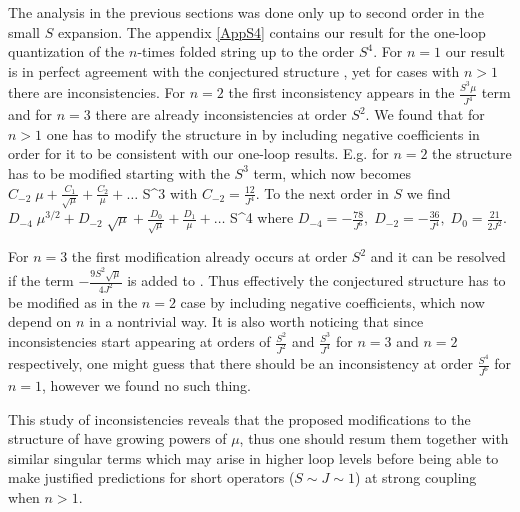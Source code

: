 
The analysis in the previous sections was done only up to second order in the small $S$ expansion. The appendix \ref{AppS4} contains our result for the
one-loop quantization of the $n$-times folded string up to the order $S^4$. For $n=1$ our result is in perfect agreement with the conjectured structure , yet for cases with $n>1$ there are inconsistencies.
For $n=2$ the first inconsistency appears in the $\frac{S^3\mu}{J^4}$ term and for $n=3$ there are already inconsistencies at order $S^2$. We found that for $n>1$ one has to modify the structure in  by
including negative coefficients in order for it to be consistent with our one-loop results. E.g. for $n=2$ the structure has to be modified starting with the $S^3$ term, which now becomes
\beq
\(
C_{-2}\;\mu+\frac{C_1}{\sqrt\mu}+\frac{C_2}{\mu}+\dots
\) S^3
\eeq
with $C_{-2}=\frac{12}{J^4}$. To the next order in $S$ we find
\beq
\(
D_{-4}\;\mu^{3/2} +D_{-2}\;\sqrt{\mu}+ \frac{D_{0}}{\sqrt\mu}+\frac{D_1}{\mu}+\dots
\) S^4
\eeq
where $D_{-4}=-\frac{78}{J^6},\;D_{-2}=-\frac{36}{J^4},\;D_0=\frac{21}{2J^2}$.

For $n=3$ the first modification already occurs at order $S^2$ and it can be resolved if the term $-\frac{9 S^2\sqrt\mu}{4 J^2}$ is added to .
Thus effectively the conjectured structure  has to be modified as in the $n=2$ case by including negative coefficients, which now depend on $n$ in a nontrivial way.
It is also worth noticing that since inconsistencies start appearing at orders of $\frac{S^2}{J^2}$ and $\frac{S^3}{J^4}$ for $n=3$ and $n=2$ respectively, one might guess that
there should be an inconsistency at order $\frac{S^4}{J^6}$ for $n=1$, however we found no such thing.

This study of inconsistencies reveals that the proposed modifications to the structure of  have growing powers of $\mu$,
thus one should resum them together with similar singular terms which may arise in higher loop levels before being able to make justified predictions
for short operators ($S\sim J\sim 1$) at strong coupling when $n>1$.


